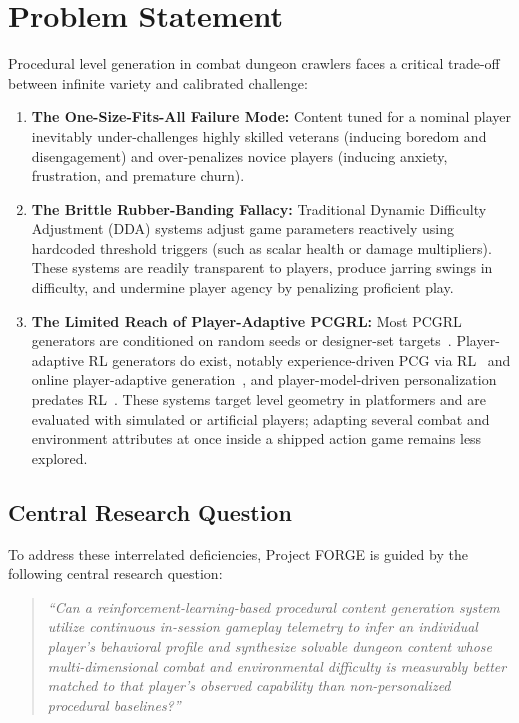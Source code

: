 \section{Problem Statement}
Procedural level generation in combat dungeon crawlers faces a critical trade-off between infinite variety and calibrated challenge:
\begin{enumerate}
    \item \textbf{The One-Size-Fits-All Failure Mode:} Content tuned for a nominal player inevitably under-challenges highly skilled veterans (inducing boredom and disengagement) and over-penalizes novice players (inducing anxiety, frustration, and premature churn).
    \item \textbf{The Brittle Rubber-Banding Fallacy:} Traditional Dynamic Difficulty Adjustment (DDA) systems adjust game parameters reactively using hardcoded threshold triggers (such as scalar health or damage multipliers). These systems are readily transparent to players, produce jarring swings in difficulty, and undermine player agency by penalizing proficient play.
    \item \textbf{The Limited Reach of Player-Adaptive PCGRL:} Most PCGRL generators are conditioned on random seeds or designer-set targets~\cite{earle2021controllable, earle2024pcgrlplus}. Player-adaptive RL generators do exist, notably experience-driven PCG via RL~\cite{shu2021edrl} and online player-adaptive generation~\cite{wang2022oparl}, and player-model-driven personalization predates RL~\cite{shaker2010personalized}. These systems target level geometry in platformers and are evaluated with simulated or artificial players; adapting several combat and environment attributes at once inside a shipped action game remains less explored.
\end{enumerate}

\subsection*{Central Research Question}
To address these interrelated deficiencies, Project FORGE is guided by the following central research question:
\begin{quote}
\textit{``Can a reinforcement-learning-based procedural content generation system utilize continuous in-session gameplay telemetry to infer an individual player's behavioral profile and synthesize solvable dungeon content whose multi-dimensional combat and environmental difficulty is measurably better matched to that player's observed capability than non-personalized procedural baselines?''}
\end{quote}

